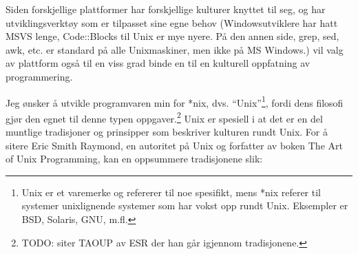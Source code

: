 \documentclass[11pt]{article}
\begin{document}
Siden forskjellige plattformer har forskjellige kulturer knyttet til seg, og har utviklingsverktøy som er tilpasset sine egne behov (Windowsutviklere har hatt MSVS lenge, Code::Blocks til Unix er mye nyere. På den annen side, grep, sed, awk, etc. er standard på alle Unixmaskiner, men ikke på MS Windows.) vil valg av plattform også til en viss grad binde en til en kulturell oppfatning av programmering.

Jeg ønsker å utvikle programvaren min for *nix, dvs. ``Unix''\footnote{Unix er et varemerke og refererer til noe spesifikt, mens *nix referer til systemer unixlignende systemer som har vokst opp rundt Unix. Eksempler er BSD, Solaris, GNU, m.fl.}, fordi dens filosofi gjør den egnet til denne typen oppgaver.\footnote{TODO: siter TAOUP av ESR der han går igjennom tradisjonene.}
Unix er spesiell i at det er en del muntlige tradisjoner og prinsipper som beskriver kulturen rundt Unix. 
For å sitere Eric Smith Raymond, en autoritet på Unix og forfatter av boken The Art of Unix Programming, kan en oppsummere tradisjonene slik:
\end{document}
